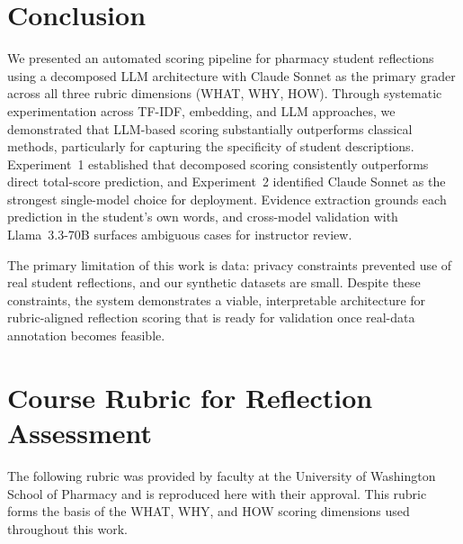 \documentclass[11pt]{article}
\begin{document}
\section{Conclusion}

We presented an automated scoring pipeline for pharmacy student reflections using a decomposed LLM architecture with Claude Sonnet as the primary grader across all three rubric dimensions (WHAT, WHY, HOW). Through systematic experimentation across TF-IDF, embedding, and LLM approaches, we demonstrated that LLM-based scoring substantially outperforms classical methods, particularly for capturing the specificity of student descriptions. Experiment~1 established that decomposed scoring consistently outperforms direct total-score prediction, and Experiment~2 identified Claude Sonnet as the strongest single-model choice for deployment. Evidence extraction grounds each prediction in the student's own words, and cross-model validation with Llama~3.3-70B surfaces ambiguous cases for instructor review.

The primary limitation of this work is data: privacy constraints prevented use of real student reflections, and our synthetic datasets are small. Despite these constraints, the system demonstrates a viable, interpretable architecture for rubric-aligned reflection scoring that is ready for validation once real-data annotation becomes feasible.




\appendix
\section{Course Rubric for Reflection Assessment}
\label{app:rubric}

The following rubric was provided by faculty at the University of Washington School of Pharmacy and is reproduced here with their approval. This rubric forms the basis of the WHAT, WHY, and HOW scoring dimensions used throughout this work.

\vspace{1em}
\end{document}
